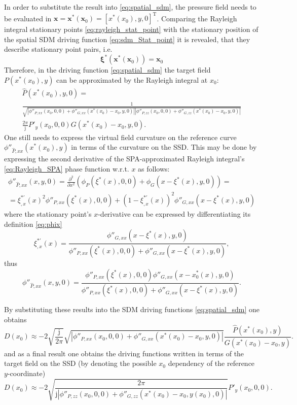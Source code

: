 \documentclass[12pt,a4paper]{article}
\newcommand{\ti}{\mathrm{j}}
\newcommand{\vx}{\mathbf{x}}
\newcommand{\vxi}{\bm{\xi}}
\newcommand{\vxo}{\mathbf{x}_0}
\begin{document}
In order to substitute the result into \eqref{eq:spatial_sdm}, the pressure field needs to be evaluated in $\vx = \vx^*(\vxo) = [x^*(x_0), y, 0]^{\mathrm{T}}$.
Comparing the Rayleigh integral stationary points \eqref{eq:rayleigh_stat_point} with the stationary position of the spatial SDM driving function \eqref{eq:sdm_Stat_point} it is revealed, that they describe stationary point pairs, i.e.
%
\begin{equation}
\vxi^*(\vx^*(\vx_0)) = \vx_0
\end{equation}
%
Therefore, in the driving function \eqref{eq:spatial_sdm} the target field $P(x^*(x_0),y)$ can be approximated by the Rayleigh integral at $x_0$:
%
\begin{multline}
\hat{P}(x^*(x_0),y,0) = \\ \frac{1}{\sqrt{ 
\left| \phi''_{P,xx}(x_0,0,0) + \phi''_{G,xx}(x^*(x_0) - x_0,y,0) \right|
\left| \phi''_{P,zz}(x_0,0,0	) + \phi''_{G,zz}(x^*(x_0) - x_0,y,0) \right|
}}
\\
 \frac{2\pi}{\ti}  P'_y(x_0,0,0) G(x^*(x_0) - x_0,y,0).
\end{multline}
%
One still needs to express the virtual field curvature on the reference curve $\phi''_{\hat{P},xx}(x^*(x_0),y)$
in terms of the curvature on the SSD.
This may be done by expressing the second derivative of the SPA-approximated Rayleigh integral's \eqref{eq:Rayleigh_SPA} phase function w.r.t. $x$ as follows:
%
\begin{multline}
\phi''_{\hat{P},xx}(x,y,0) = 
\frac{\partial^2}{\partial x^2} \left( \phi_P(\xi^*(x),0,0) + \phi_G(x-\xi^*(x),y,0) \right) = \\
=   \xi^{*'}_{,x}(x)^2 \phi''_{P,xx}(\xi^*(x),0,0) + (1-\xi^{*'}_{,x}(x))^2\phi''_{G,xx	}(x-\xi^*(x),y,0)
\end{multline}
%
where the stationary point's $x$-derivative can be expressed by differentiating its definition \eqref{eq:phix}
%
\begin{equation}
\xi^{*'}_{,x}(x) =  \frac{ \phi''_{G,xx}(x-\xi^*(x),y,0) }{\phi''_{P,xx}(\xi^*(x),0,0) + \phi''_{G,xx}(x-\xi^*(x),y,0) },
\end{equation}
%
thus
\begin{equation}
\phi''_{\hat{P},xx}(x,y,0)  =
\frac{ \phi''_{P,xx}(\xi^*(x),0,0) \phi''_{G,xx}(x-x^*_0(x),y,0) }
{\phi''_{P,xx}(\xi^*(x),0,0) + \phi''_{G,xx}(x- \xi^*(x),y,0) } .
\end{equation}

By substituting these results into the SDM driving functions \eqref{eq:spatial_sdm} one obtains
%
\begin{equation}
D(x_0) \approx -2
\sqrt{\frac{\ti}{2\pi}} 
\sqrt{ \left| \phi''_{P,xx}(x_0,0,0) + \phi''_{G,xx}(x^*(x_0)-x_0,y,0) 	\right|}
\frac{\hat{P}(x^*(x_0),y)}{G(x^*(x_0) - x_0,y)}.
\end{equation}
%
and as a final result one obtains the driving functions written in terms of the target field on the SSD (by denoting the possible $x_0$ dependency of the reference $y$-coordinate)
%
\begin{equation}
D(x_0) \approx -2
\sqrt{ \frac{2\pi}{\ti \left| \phi''_{P,zz}(x_0,0,0	) + \phi''_{G,zz}(x^*(x_0) - x_0,y(x_0),0) \right|}}
 P'_y(x_0,0,0).
\label{eq:SDM_rayleigh}
\end{equation}
\end{document}
